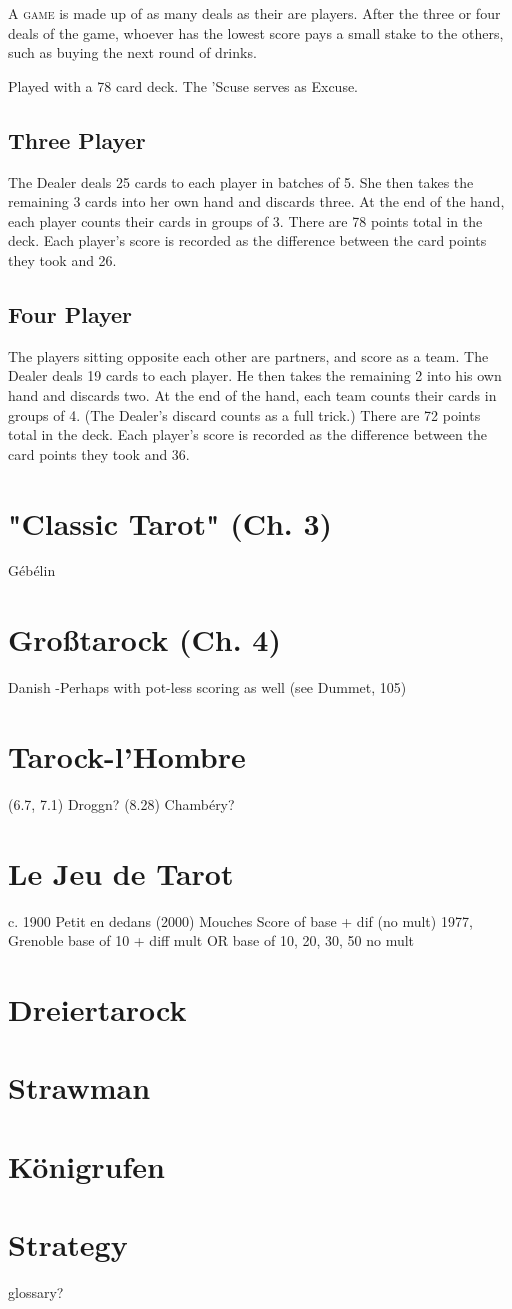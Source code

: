 \documentclass[ebook,12pt,twoside,openright,extrafontsizes,final]{memoir}
\begin{document}
\medskip
\lettrine{A}{ game} is made up of as many deals as their are players.  After the 
three or four deals of the game, whoever has the lowest score pays a small stake 
to the others, such as buying the next round of drinks.

Played with a 78 card deck. The ’Scuse serves as Excuse.

\section{Three Player}
The Dealer deals 25 cards to each player in batches of 5.  She then takes the
remaining 3 cards into her own hand and discards three.
At the end of the hand, each player counts their cards in groups of 3.  There
are 78 points total in the deck.  Each player's score is recorded as the 
difference between the card points they took and 26.

\section{Four Player}
The players sitting opposite each other are partners, and score as a team.
The Dealer deals 19 cards to each player.  He then takes the remaining 2 into 
his own hand and discards two.
At the end of the hand, each team counts their cards in groups of 4. (The 
Dealer’s discard counts as a full trick.)  There are 72 points total in the 
deck.  Each player's score is recorded as the difference between the card 
points they took and 36.


\chapter{"Classic Tarot" (Ch. 3)}
Gébélin

\chapter{Großtarock (Ch. 4)}
Danish -Perhaps with pot-less scoring as well (see Dummet, 105)

\chapter{Tarock-l’Hombre}
(6.7, 7.1)
Droggn?
(8.28) Chambéry?


\chapter{Le Jeu de Tarot}
c. 1900
Petit en dedans (2000)
Mouches
Score of base + dif (no mult) 1977, Grenoble
base of 10 + diff mult OR 
base of 10, 20, 30, 50 no mult


\chapter{Dreiertarock}

\chapter{Strawman}

\chapter{Königrufen}

\chapter{Strategy}

glossary?
\end{document}
